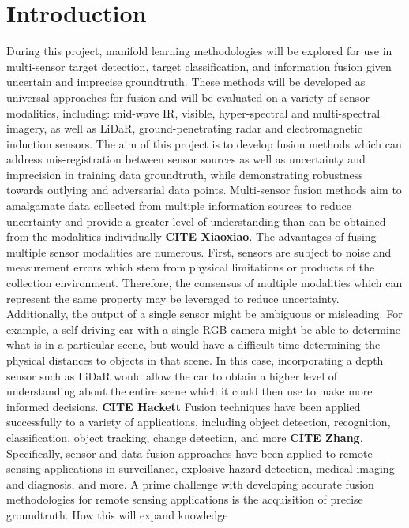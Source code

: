\chapter{Introduction}

During this project, manifold learning methodologies will be explored for use in multi-sensor target detection, target classification, and information fusion given uncertain and imprecise groundtruth.  These methods will be developed as universal approaches for fusion and will be evaluated on a variety of sensor modalities, including: mid-wave IR, visible, hyper-spectral and multi-spectral imagery, as well as LiDaR, ground-penetrating radar and electromagnetic induction sensors.  The aim of this project is to develop fusion methods which can address mis-registration between sensor sources as well as uncertainty and imprecision in training data groundtruth, while demonstrating robustness towards outlying and adversarial data points. \newline
Multi-sensor fusion methods aim to amalgamate data collected from multiple information sources to reduce uncertainty and provide a greater level of understanding than can be obtained from the modalities individually \textbf{CITE Xiaoxiao}.  The advantages of fusing multiple sensor modalities are numerous.  First, sensors are subject to noise and measurement errors which stem from physical limitations or products of the collection environment.  Therefore, the consensus of multiple modalities which can represent the same property may be leveraged to reduce uncertainty.  Additionally, the output of a single sensor might be ambiguous or misleading.  For example, a self-driving car with a single RGB camera might be able to determine what is in a particular scene, but would have a difficult time determining the physical distances to objects in that scene.  In this case, incorporating a depth sensor such as LiDaR would allow the car to obtain a higher level of understanding about the entire scene which it could then use to make more informed decisions. \textbf{CITE Hackett}  Fusion techniques have been applied successfully to a variety of applications, including object detection, recognition, classification, object tracking, change detection, and more \textbf{CITE Zhang}.  Specifically, sensor and data fusion approaches have been applied to remote sensing applications in surveillance, explosive hazard detection, medical imaging and diagnosis, and more.
\newline
A prime challenge with developing accurate fusion methodologies for remote sensing applications is the acquisition of precise groundtruth. 
\newline
How this will expand knowledge

